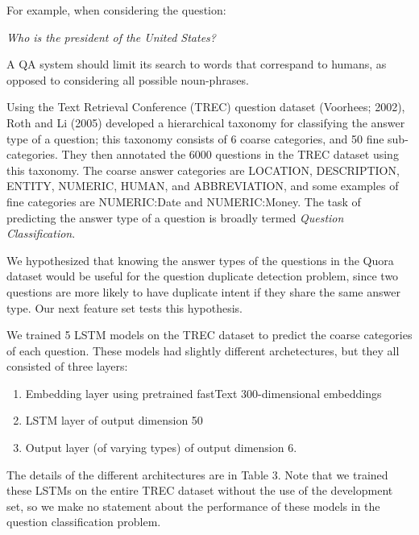 \documentclass[letterpaper, 10 pt, conference]{ieeeconf}  %
\begin{document}
For example, when considering the question:
\begin{center}
\emph{Who is the president of the United States?}
\end{center}
A QA system should limit its search to words that correspand to humans, as opposed to considering all possible noun-phrases.

Using the Text Retrieval Conference (TREC) question dataset (Voorhees; 2002), Roth and Li (2005) developed a hierarchical taxonomy for classifying the answer type of a question; this taxonomy consists of 6 coarse categories, and 50 fine sub-categories. They then annotated the 6000 questions in the TREC dataset using this taxonomy. The coarse answer categories are LOCATION, DESCRIPTION, ENTITY, NUMERIC, HUMAN, and ABBREVIATION, and some examples of fine categories are NUMERIC:Date and NUMERIC:Money. The task of predicting the answer type of a question is broadly termed \emph{Question Classification}. 

We hypothesized that knowing the answer types of the questions in the Quora dataset would be useful for the question duplicate detection problem, since two questions are more likely to have duplicate intent if they share the same answer type. Our next feature set tests this hypothesis. 

We trained 5 LSTM models on the TREC dataset to predict the coarse categories of each question. These models had slightly different archetectures, but they all consisted of three layers:
\begin{enumerate}
\item Embedding layer using pretrained fastText 300-dimensional embeddings
\item LSTM layer of output dimension 50
\item Output layer (of varying types) of output dimension 6.
\end{enumerate}
The details of the different architectures are in Table 3. Note that we trained these LSTMs on the entire TREC dataset without the use of the development set,  so we make no statement about the performance of these models in the question classification problem. 
\end{document}
